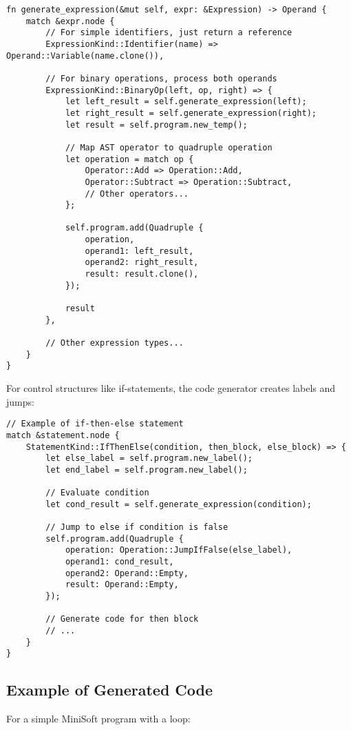 \documentclass[12pt,a4paper]{article}
\begin{document}
\begin{lstlisting}[caption={Expression Code Generation}]
fn generate_expression(&mut self, expr: &Expression) -> Operand {
    match &expr.node {
        // For simple identifiers, just return a reference
        ExpressionKind::Identifier(name) => Operand::Variable(name.clone()),
        
        // For binary operations, process both operands
        ExpressionKind::BinaryOp(left, op, right) => {
            let left_result = self.generate_expression(left);
            let right_result = self.generate_expression(right);
            let result = self.program.new_temp();

            // Map AST operator to quadruple operation
            let operation = match op {
                Operator::Add => Operation::Add,
                Operator::Subtract => Operation::Subtract,
                // Other operators...
            };

            self.program.add(Quadruple {
                operation,
                operand1: left_result,
                operand2: right_result,
                result: result.clone(),
            });

            result
        },
        
        // Other expression types...
    }
}
\end{lstlisting}

For control structures like if-statements, the code generator creates labels and jumps:

\begin{lstlisting}[caption={If-Statement Code Generation}]
// Example of if-then-else statement
match &statement.node {
    StatementKind::IfThenElse(condition, then_block, else_block) => {
        let else_label = self.program.new_label();
        let end_label = self.program.new_label();
        
        // Evaluate condition
        let cond_result = self.generate_expression(condition);
        
        // Jump to else if condition is false
        self.program.add(Quadruple {
            operation: Operation::JumpIfFalse(else_label),
            operand1: cond_result,
            operand2: Operand::Empty,
            result: Operand::Empty,
        });
        
        // Generate code for then block
        // ...
    }
}
\end{lstlisting}

\subsection{Example of Generated Code}
For a simple MiniSoft program with a loop:
\end{document}

